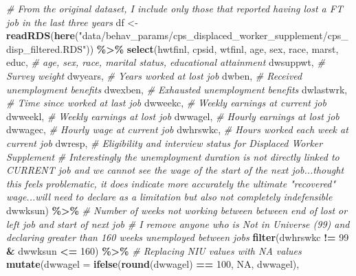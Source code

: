 \documentclass[
]{article}
\newenvironment{Shaded}{\begin{snugshade}}{\end{snugshade}}
\newcommand{\AttributeTok}[1]{\textcolor[rgb]{0.13,0.29,0.53}{#1}}
\newcommand{\CommentTok}[1]{\textcolor[rgb]{0.56,0.35,0.01}{\textit{#1}}}
\newcommand{\ConstantTok}[1]{\textcolor[rgb]{0.56,0.35,0.01}{#1}}
\newcommand{\DecValTok}[1]{\textcolor[rgb]{0.00,0.00,0.81}{#1}}
\newcommand{\FunctionTok}[1]{\textcolor[rgb]{0.13,0.29,0.53}{\textbf{#1}}}
\newcommand{\NormalTok}[1]{#1}
\newcommand{\OtherTok}[1]{\textcolor[rgb]{0.56,0.35,0.01}{#1}}
\newcommand{\SpecialCharTok}[1]{\textcolor[rgb]{0.81,0.36,0.00}{\textbf{#1}}}
\newcommand{\StringTok}[1]{\textcolor[rgb]{0.31,0.60,0.02}{#1}}
\begin{document}
\begin{Shaded}
\begin{Highlighting}[]
\CommentTok{\# From the original dataset, I include only those that reported having lost a FT job in the last three years}
\NormalTok{df }\OtherTok{\textless{}{-}} \FunctionTok{readRDS}\NormalTok{(}\FunctionTok{here}\NormalTok{(}\StringTok{"data/behav\_params/cps\_displaced\_worker\_supplement/cps\_disp\_filtered.RDS"}\NormalTok{)) }\SpecialCharTok{\%\textgreater{}\%} 
  \FunctionTok{select}\NormalTok{(hwtfinl, cpsid, wtfinl, age, sex, race, marst, educ, }\CommentTok{\# age, sex, race, marital status, educational attainment}
\NormalTok{         dwsuppwt, }\CommentTok{\# Survey weight}
\NormalTok{         dwyears, }\CommentTok{\# Years worked at lost job}
\NormalTok{         dwben, }\CommentTok{\# Received unemployment benefits}
\NormalTok{         dwexben, }\CommentTok{\# Exhausted unemployment benefits}
\NormalTok{         dwlastwrk, }\CommentTok{\# Time since worked at last job}
\NormalTok{         dwweekc, }\CommentTok{\# Weekly earnings at current job}
\NormalTok{         dwweekl, }\CommentTok{\# Weekly earnings at lost job}
\NormalTok{         dwwagel, }\CommentTok{\# Hourly earnings at lost job}
\NormalTok{         dwwagec, }\CommentTok{\# Hourly wage at current job}
\NormalTok{         dwhrswkc, }\CommentTok{\# Hours worked each week at current job}
\NormalTok{         dwresp, }\CommentTok{\# Eligibility and interview status for Displaced Worker Supplement}
         \CommentTok{\# Interestingly the unemployment duration is not directly linked to CURRENT job and we cannot see the wage of the start of the next job...thought this feels problematic, it does indicate more accurately the ultimate "recovered" wage...will need to declare as a limitation but also not completely indefensible}
\NormalTok{         dwwksun) }\SpecialCharTok{\%\textgreater{}\%}  \CommentTok{\# Number of weeks not working between between end of lost or left job and start of next job}
  \CommentTok{\# I remove anyone who is Not in Universe (99) and declaring greater than 160 weeks unemployed between jobs}
\FunctionTok{filter}\NormalTok{(dwhrswkc }\SpecialCharTok{!=} \DecValTok{99} \SpecialCharTok{\&}\NormalTok{ dwwksun }\SpecialCharTok{\textless{}=} \DecValTok{160}\NormalTok{) }\SpecialCharTok{\%\textgreater{}\%} 
  \CommentTok{\# Replacing NIU values with NA values}
  \FunctionTok{mutate}\NormalTok{(}\AttributeTok{dwwagel =} \FunctionTok{ifelse}\NormalTok{(}\FunctionTok{round}\NormalTok{(dwwagel) }\SpecialCharTok{==} \DecValTok{100}\NormalTok{, }\ConstantTok{NA}\NormalTok{, dwwagel),}

\end{Highlighting}
\end{Shaded}
\end{document}
